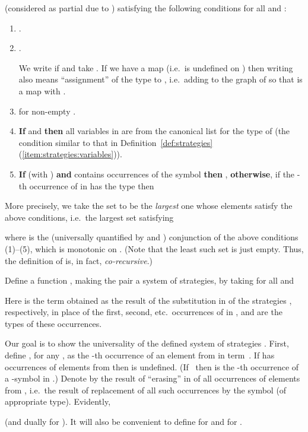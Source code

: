 \documentclass[fleqn]{LMCS}
\theoremstyle{plain}\newtheorem{satz}[thm]{Satz}
\theoremstyle{plain}\newtheorem{hyp}[thm]{Hypothesis}
\theoremstyle{plain}\newtheorem{hyps}[thm]{Hypotheses}
\theoremstyle{definition}\newtheorem{note}[thm]{Note}
\newcommand{\?}{\mbox{?}}
\begin{document}
(considered as partial due to ) 
satisfying the following conditions for all  and 
:
\begin{enumerate}[(1)]
\item 
.
\item
. 

\noindent
We write  if  and take 
.  
If we have a map  
(i.e.\  is undefined on ) then writing 
 also means ``assignment'' of the type  to , i.e.\ 
adding  to the graph of  so that 
 is a map with . 
\item
 for non-empty . 


\item
{\bf If}  and  {\bf then} all variables in  are 
from the canonical list  for the type of  
(the condition similar to that in 
Definition~\ref{def:strategies}(\ref{item:strategies:variables})).

\item
{\bf If}  (with ) 
{\bf and}  contains  occurrences 
of the symbol  
{\bf then} 
, 
{\bf otherwise}, if the -th occurrence of  in  has the type 
 then 

\end{enumerate}
More precisely, we take the set  to be the \emph{largest} 
one whose elements  satisfy the above conditions, i.e.\ the largest set  
satisfying 
 
where  is the (universally quantified by  and ) 
conjunction of the above conditions (1)--(5), which is 
monotonic on . 
(Note that the least such set is just empty. 
Thus, the definition of  is, in fact, \emph{co-recursive}.) 

Define a function , 
making the pair  a system of strategies, 
by taking for all 
 and 

Here  
is the term obtained as the result of the substitution 
in  of the strategies , 
respectively, in place of the first, second, etc.\ occurrences of  in , and 
 are the types of these occurrences. 


Our goal is to show the universality of the defined system of strategies 
. First, define , for any , 
as the -th occurrence of an element from  in term~. If  has  
occurrences of elements from  then  is undefined. 
(If~ then  is the -th occurrence of a -symbol in .)
Denote by 
 the result of ``erasing'' in  of all occurrences of elements 
from , i.e.\ the result of replacement of all such occurrences by the symbol 
 (of appropriate type). 
Evidently, 

(and dually for ). 
It will also be convenient to define  for  
and  for . 
\end{document}
